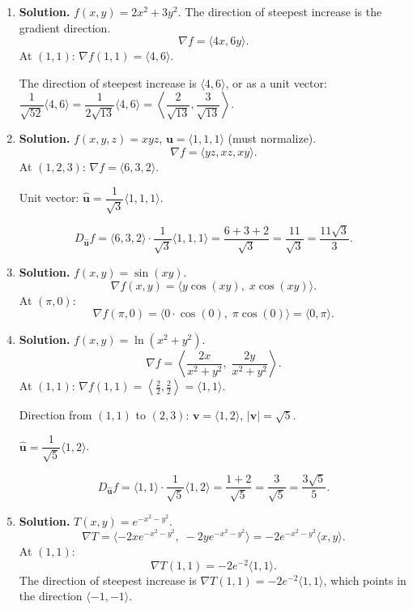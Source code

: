 \begin{enumerate}
\[
D_{\mathbf{u}}f = \nabla f \cdot \mathbf{u} = \langle 1,1\rangle \cdot \frac{1}{5}\langle 3,4\rangle = \frac{3+4}{5} = \boxed{\frac{7}{5}}.
\]

\item \textbf{Solution.}
$f(x,y) = 2x^2 + 3y^2$. The direction of steepest increase is the gradient direction.
\[
\nabla f = \langle 4x, 6y\rangle.
\]
At $(1,1)$: $\nabla f(1,1) = \langle 4, 6\rangle$.

The direction of steepest increase is $\boxed{\langle 4, 6\rangle}$, or as a unit vector: $\dfrac{1}{\sqrt{52}}\langle 4,6\rangle = \dfrac{1}{2\sqrt{13}}\langle 4,6\rangle = \left\langle \dfrac{2}{\sqrt{13}}, \dfrac{3}{\sqrt{13}}\right\rangle$.

\item \textbf{Solution.}
$f(x,y,z) = xyz$, $\mathbf{u} = \langle 1,1,1\rangle$ (must normalize).
\[
\nabla f = \langle yz, xz, xy\rangle.
\]
At $(1,2,3)$: $\nabla f = \langle 6, 3, 2\rangle$.

Unit vector: $\hat{\mathbf{u}} = \dfrac{1}{\sqrt{3}}\langle 1,1,1\rangle$.

\[
D_{\hat{\mathbf{u}}}f = \langle 6,3,2\rangle \cdot \frac{1}{\sqrt{3}}\langle 1,1,1\rangle = \frac{6+3+2}{\sqrt{3}} = \boxed{\frac{11}{\sqrt{3}} = \frac{11\sqrt{3}}{3}}.
\]

\item \textbf{Solution.}
$f(x,y) = \sin(xy)$.
\[
\nabla f(x,y) = \langle y\cos(xy),\; x\cos(xy)\rangle.
\]
At $(\pi, 0)$:
\[
\nabla f(\pi, 0) = \langle 0 \cdot \cos(0),\; \pi\cos(0)\rangle = \boxed{\langle 0, \pi\rangle}.
\]

\item \textbf{Solution.}
$f(x,y) = \ln(x^2+y^2)$.
\[
\nabla f = \left\langle \frac{2x}{x^2+y^2},\; \frac{2y}{x^2+y^2}\right\rangle.
\]
At $(1,1)$: $\nabla f(1,1) = \left\langle \frac{2}{2}, \frac{2}{2}\right\rangle = \langle 1, 1\rangle$.

Direction from $(1,1)$ to $(2,3)$: $\mathbf{v} = \langle 1, 2\rangle$, $|\mathbf{v}| = \sqrt{5}$.

$\hat{\mathbf{u}} = \dfrac{1}{\sqrt{5}}\langle 1, 2\rangle$.

\[
D_{\hat{\mathbf{u}}}f = \langle 1,1\rangle \cdot \frac{1}{\sqrt{5}}\langle 1,2\rangle = \frac{1+2}{\sqrt{5}} = \boxed{\frac{3}{\sqrt{5}} = \frac{3\sqrt{5}}{5}}.
\]

\item \textbf{Solution.}
$T(x,y) = e^{-x^2-y^2}$.
\[
\nabla T = \langle -2xe^{-x^2-y^2},\; -2ye^{-x^2-y^2}\rangle = -2e^{-x^2-y^2}\langle x, y\rangle.
\]
At $(1,1)$:
\[
\nabla T(1,1) = -2e^{-2}\langle 1,1\rangle.
\]
The direction of steepest increase is $\nabla T(1,1) = -2e^{-2}\langle 1,1\rangle$, which points in the direction $\langle -1, -1\rangle$.


\end{enumerate}

